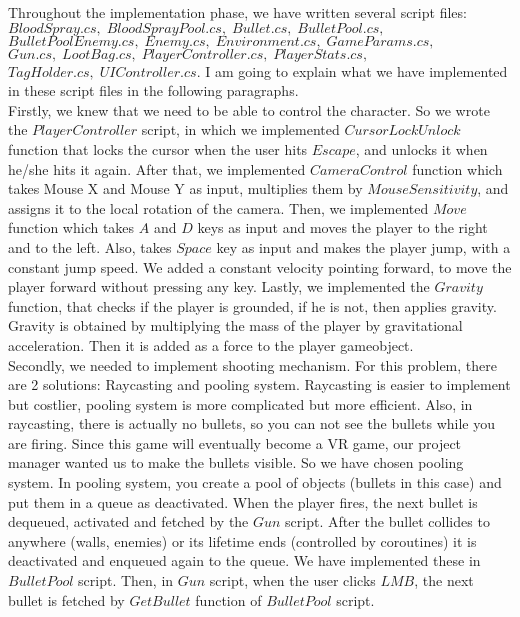 \documentclass[a4paper]{article}
\begin{document}
\begin{minipage}{\dimexpr\textwidth-1cm}
\hspace{0.5cm} Throughout the implementation phase, we have written several script files: $BloodSpray.cs,\; BloodSprayPool.cs,\; Bullet.cs,\; BulletPool.cs,$\\$ BulletPoolEnemy.cs,\; Enemy.cs,\; Environment.cs,\; GameParams.cs,$\\$ Gun.cs,\; LootBag.cs,\; PlayerController.cs,\; PlayerStats.cs,$\\$ TagHolder.cs,\; UIController.cs$. I am going to explain what we have implemented in these script files in the following paragraphs.\\
Firstly, we knew that we need to be able to control the character. So we wrote the $PlayerController$ script, in which we implemented $CursorLockUnlock$ function that locks the cursor when the user hits $Escape$, and unlocks it when he/she hits it again. After that, we implemented $CameraControl$ function which takes Mouse X and Mouse Y as input, multiplies them by $MouseSensitivity$, and assigns it to the local rotation of the camera. Then, we implemented $Move$ function which takes $A$ and $D$ keys as input and moves the player to the right and to the left. Also, takes $Space$ key as input and makes the player jump, with a constant jump speed. We added a constant velocity pointing forward, to move the player forward without pressing any key. Lastly, we implemented the $Gravity$ function, that checks if the player is grounded, if he is not, then applies gravity. Gravity is obtained by multiplying the mass of the player by gravitational acceleration. Then it is added as a force to the player gameobject.\\
Secondly, we needed to implement shooting mechanism. For this problem, there are 2 solutions: Raycasting and pooling system. Raycasting is easier to implement but costlier, pooling system is more complicated but more efficient. Also, in raycasting, there is actually no bullets, so you can not see the bullets while you are firing. Since this game will eventually become a VR game, our project manager wanted us to make the bullets visible. So we have chosen pooling system. In pooling system, you create a pool of objects (bullets in this case) and put them in a queue as deactivated. When the player fires, the next bullet is dequeued, activated and fetched by the $Gun$ script. After the bullet collides to anywhere (walls, enemies) or its lifetime ends (controlled by coroutines) it is deactivated and enqueued again to the queue. We have implemented these in $BulletPool$ script. Then, in $Gun$ script, when the user clicks $LMB$, the next bullet is fetched by $GetBullet$ function of $BulletPool$ script.\\

\end{minipage}
\end{document}
